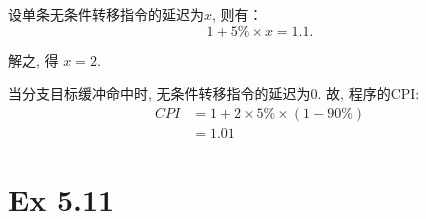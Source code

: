 \begin{solve}
  设单条无条件转移指令的延迟为$x$, 则有：
  \begin{displaymath}
    1+5\%\times{}x=1.1.
  \end{displaymath}

  解之, 得 $x=2$.

  当分支目标缓冲命中时, 无条件转移指令的延迟为0. 故, 程序的CPI:
  \begin{align*}
    CPI &= 1 + 2 \times 5\% \times (1 - 90\% ) \\
    &= 1.01
  \end{align*}
\end{solve}

\section{Ex 5.11}

